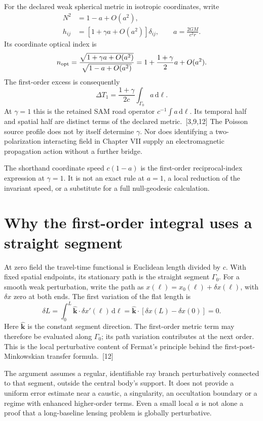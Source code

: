 \documentclass[10pt,twocolumn,letterpaper]{article}
\newcommand{\dd}{\mathrm{d}}
\begin{document}
For the declared weak spherical metric in isotropic coordinates, write
\[
\begin{aligned}
 N^2&=1-a+O(a^2),\\
 h_{ij}&=[1+\gamma a+O(a^2)]\delta_{ij},\qquad a=\frac{2GM}{c^2r}.
\end{aligned}
\]
Its coordinate optical index is
\[
 n_{\rm opt}=\frac{\sqrt{1+\gamma a+O(a^2)}}{\sqrt{1-a+O(a^2)}}
 =1+\frac{1+\gamma}{2}a+O(a^2).
\]
The first-order excess is consequently
\[
 \Delta T_1=\frac{1+\gamma}{2c}\int_{\Gamma_0}a\,\dd\ell.
\]
At $\gamma=1$ this is the retained SAM road operator $c^{-1}\int a\,\dd\ell$. Its temporal half and spatial half are distinct terms of the declared metric.~[3,9,12] The Poisson source profile does not by itself determine $\gamma$. Nor does identifying a two-polarization interacting field in Chapter VII supply an electromagnetic propagation action without a further bridge.

The shorthand coordinate speed $c(1-a)$ is the first-order reciprocal-index expression at $\gamma=1$. It is not an exact rule at $a=1$, a local reduction of the invariant speed, or a substitute for a full null-geodesic calculation.


\section{Why the first-order integral uses a straight segment}
At zero field the travel-time functional is Euclidean length divided by $c$. With fixed spatial endpoints, its stationary path is the straight segment $\Gamma_0$. For a smooth weak perturbation, write the path as $x(\ell)=x_0(\ell)+\delta x(\ell)$, with $\delta x$ zero at both ends. The first variation of the flat length is
\[
 \delta L=\int_0^L\widehat{\mathbf k}\cdot\delta x'(\ell)\,\dd\ell
 =\widehat{\mathbf k}\cdot[\delta x(L)-\delta x(0)]=0.
\]
Here $\widehat{\mathbf k}$ is the constant segment direction. The first-order metric term may therefore be evaluated along $\Gamma_0$; its path variation contributes at the next order. This is the local perturbative content of Fermat's principle behind the first-post-Minkowskian transfer formula.~[12]

The argument assumes a regular, identifiable ray branch perturbatively connected to that segment, outside the central body's support. It does not provide a uniform error estimate near a caustic, a singularity, an occultation boundary or a regime with enhanced higher-order terms. Even a small local $a$ is not alone a proof that a long-baseline lensing problem is globally perturbative.
\end{document}
